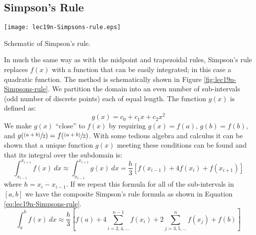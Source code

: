\subsection{Simpson's Rule}
\begin{marginfigure}
\texttt{[image: lec19n-Simpsons-rule.eps]}
\caption{Schematic of Simpson's rule.}
\label{fig:lec19n-Simpsons-rule}
\end{marginfigure}
In much the same way as with the midpoint and trapezoidal rules, Simpson's rule replaces $f(x)$ with a function that can be easily integrated; in this case a quadratic function.  The method is schematically shown in Figure \ref{fig:lec19n-Simpsons-rule}.  We partition the domain into an even number of sub-intervals (odd number of discrete points) each of equal length.  The function $g(x)$ is defined as:
\begin{equation*}
g(x) = c_0 + c_1x + c_2 x^2
\end{equation*}
We make $g(x)$ ``close'' to $f(x)$ by requiring $g(x)=f(a)$, $g(b) = f(b)$, and $g(\sfrac{(a+b)}{2}) = f(\sfrac{(a+b)}{2})$.  With some tedious algebra and calculus it can be shown that a unique function $g(x)$ meeting these conditions can be found and that its integral over the subdomain is:
\begin{equation*}
\int_{x_{i-1}}^{x_{i+1}} f(x) \ dx \approx \int_{x_{i-1}}^{x_{i+1}} g(x) \ dx = \frac{h}{3}\left[f(x_{i-1})+4f(x_i)+f(x_{i+1})\right] 
\end{equation*}
where $h = x_i - x_{i-1}$.
If we repeat this formula for all of the sub-intervals in $[a,b]$ we have the composite Simpson's rule formula as shown in Equation \ref{eq:lec19n-Simpsons-rule}.
\begin{equation}
\int_{a}^{b}f(x) \ dx \approx \frac{h}{3} \left[f(a) + 4 \sum\limits_{i=2,4,\dots}^{n-1} f(x_i) + 2 \sum\limits_{j=3,5,\dots}^{n} f(x_j) + f(b) \right]
\label{eq:lec19n-Simpsons-rule}
\end{equation}

